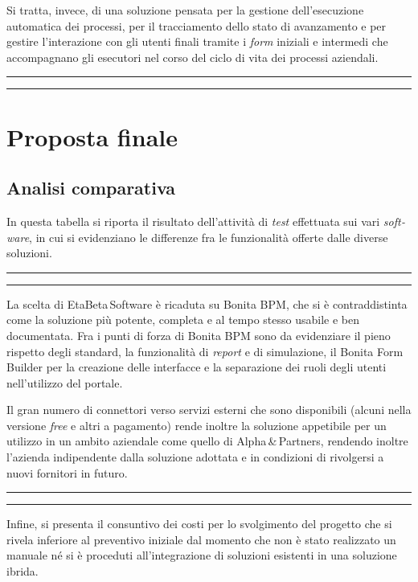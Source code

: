 \documentclass[a4paper,10pt]{article}
\newcommand{\inglese}[1]{\foreignlanguage{english}{\textit{#1}}}
\newcommand{\team}{\textsf{EtaBeta\,Software}\xspace}
\newcommand{\sw}{\inglese{software}\xspace}
\newcommand{\customer}{\textsf{Alpha\,\&\,Partners}\xspace}
\newcommand{\cambioslide}{%
\begin{center}
\Large
\rule[4pt]{0.2\linewidth}{.7pt} \ding{167} \rule[4pt]{0.2\linewidth}{.7pt}
\end{center}
}
\begin{document}
Si tratta, invece, di una soluzione pensata per la gestione dell'esecuzione automatica dei processi, per il tracciamento dello stato di avanzamento e per gestire l'interazione con gli utenti finali tramite i \inglese{form} iniziali e intermedi che accompagnano gli esecutori nel corso del ciclo di vita dei processi aziendali.

\cambioslide

\section{Proposta finale}

\subsection{Analisi comparativa}
In questa tabella si riporta il risultato dell'attività di \inglese{test} effettuata sui vari \sw, in cui si evidenziano le differenze fra le funzionalità offerte dalle diverse soluzioni.

\cambioslide

La scelta di \team è ricaduta su Bonita BPM, che si è contraddistinta come la soluzione più potente, completa e al tempo stesso usabile e ben documentata. Fra i punti di forza di Bonita BPM sono da evidenziare il pieno rispetto degli standard, la funzionalità di \inglese{report} e di simulazione, il Bonita Form Builder per la creazione delle interfacce e la separazione dei ruoli degli utenti nell'utilizzo del portale.

Il gran numero di connettori verso servizi esterni che sono disponibili (alcuni nella versione \inglese{free} e altri a pagamento) rende inoltre la soluzione appetibile per un utilizzo in un ambito aziendale come quello di \customer, rendendo inoltre l'azienda indipendente dalla soluzione adottata e in condizioni di rivolgersi a nuovi fornitori in futuro.

\cambioslide

Infine, si presenta il consuntivo dei costi per lo svolgimento del progetto che si rivela inferiore al preventivo iniziale dal momento che non è stato realizzato un manuale né si è proceduti all'integrazione di soluzioni esistenti in una soluzione ibrida.
\end{document}
